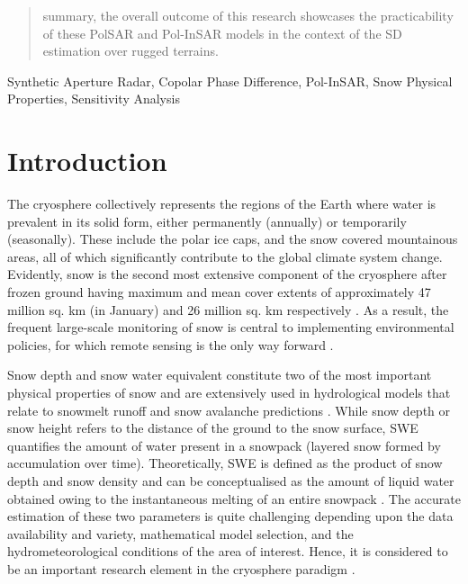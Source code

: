 \documentclass[review]{elsarticle}
\numberwithin{equation}{section}
\numberwithin{figure}{section}
\numberwithin{table}{section}
\begin{document}
\begin{frontmatter}
\begin{abstract}
summary, the overall outcome of this research showcases the practicability of these PolSAR and Pol-InSAR models in the context of the SD estimation over rugged terrains.
\end{abstract}

\begin{keyword}
Synthetic Aperture Radar, Copolar Phase Difference, Pol-InSAR, Snow Physical Properties, Sensitivity Analysis
\end{keyword}

\end{frontmatter}

\linenumbers

\section{Introduction}
\label{sec:Intro}
The cryosphere collectively represents the regions of the Earth where water is prevalent in its solid form, either permanently (annually) or temporarily (seasonally). These include the polar ice caps, and the snow covered mountainous areas, all of which significantly contribute to the global climate system change. Evidently, snow is the second most extensive component of the cryosphere after frozen ground having maximum and mean cover extents of approximately 47 million sq. km (in January) and 26 million sq. km respectively \citep{Barry2011}. As a result, the frequent large-scale monitoring of snow is central to implementing environmental policies, for which remote sensing is the only way forward \citep{Tedesco2015}.

Snow depth and snow water equivalent constitute two of the most important physical properties of snow and are extensively used in hydrological models that relate to snowmelt runoff and snow avalanche predictions \citep{Thakur2017}. While snow depth or snow height refers to the distance of the ground to the snow surface, SWE quantifies the amount of water present in a snowpack (layered snow formed by accumulation over time). Theoretically, SWE is defined as the product of snow depth and snow density and can be conceptualised as the amount of liquid water obtained owing to the instantaneous melting of
an entire snowpack \citep{Tedesco2015}. The accurate estimation of these two parameters is quite challenging depending upon the data availability and variety, mathematical model selection, and the hydrometeorological conditions of the area of interest. Hence, it is considered to be an important research element in the cryosphere paradigm \citep{Leinss2014, Leinss2015, Leinss2016}.
\end{document}
